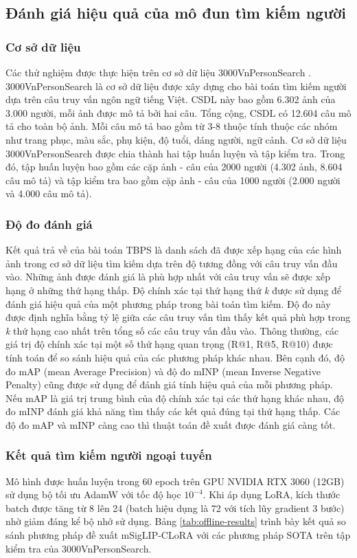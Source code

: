 \documentclass{jstarticle}
\begin{document}
\subsection{Đánh giá hiệu quả của mô đun tìm kiếm người}
\subsubsection{Cơ sở dữ liệu}
Các thử nghiệm được thực hiện trên cơ sở dữ liệu  3000VnPersonSearch \cite{pham2022towards}.  3000VnPersonSearch là cơ sở dữ liệu được xây dựng cho bài toán tìm kiếm người dựa trên câu truy vấn ngôn ngữ tiếng Việt. CSDL này bao gồm 6.302 ảnh của 3.000 người, mỗi ảnh được mô tả bởi hai câu. Tổng cộng, CSDL có 12.604 câu mô tả cho toàn bộ ảnh. Mỗi câu mô tả bao gồm từ 3-8 thuộc tính thuộc các nhóm như trang phục, màu sắc, phụ kiện, độ tuổi, dáng người, ngữ cảnh.  Cơ sở dữ liệu 3000VnPersonSearch được chia thành hai tập huấn luyện và tập kiểm tra. Trong đó, tập huấn luyện bao gồm các cặp ảnh - câu của 2000 người (4.302 ảnh, 8.604 câu mô tả) và tập kiểm tra bao gồm cặp ảnh - câu của 1000 người (2.000 người và 4.000 câu mô tả). 

\subsubsection{Độ đo đánh giá}
Kết quả trả về của bài toán TBPS là danh sách đã được xếp hạng của các hình ảnh trong cơ sở dữ liệu tìm kiếm dựa trên độ tương đồng với câu truy vấn đầu vào. Những ảnh được đánh giá là phù hợp nhất với câu truy vấn sẽ được xếp hạng ở những thứ hạng thấp. Độ chính xác tại thứ hạng thứ \textit{k} được sử dụng để đánh giá hiệu quả của một phương pháp trong bài toán tìm kiếm. Độ đo này được định nghĩa bằng tỷ lệ giữa các câu truy vấn  tìm thấy kết quả phù hợp trong \textit{k} thứ hạng cao nhất trên tổng số các câu truy vấn đầu vào.  Thông thường, các giá trị độ chính xác tại một số thứ hạng quan trọng (R@1, R@5, R@10) được tính toán để so sánh hiệu quả của các phương pháp khác nhau. Bên cạnh đó, độ đo mAP (mean Average Precision) và độ đo mINP (mean Inverse Negative Penalty) cũng được sử dụng để đánh giá tính hiệu quả của mỗi phương pháp. Nếu mAP là giá trị trung bình của độ chính xác tại các thứ hạng khác nhau, độ đo mINP đánh giá khả năng tìm thấy các kết quả đúng tại thứ hạng thấp. Các độ đo mAP và mINP càng cao thì thuật toán đề xuất được đánh giá càng tốt. 
\subsubsection{Kết quả tìm kiếm người ngoại tuyến}
Mô hình được huấn luyện trong 60 epoch trên GPU NVIDIA RTX 3060 (12GB) sử dụng bộ tối ưu AdamW với tốc độ học $10^{-4}$. Khi áp dụng LoRA, kích thước batch được tăng từ 8 lên 24 (batch hiệu dụng là 72 với tích lũy gradient 3 bước) nhờ giảm đáng kể bộ nhớ sử dụng. Bảng \ref{tab:offline-results} trình bày kết quả so sánh phương pháp đề xuất mSigLIP-CLoRA với các phương pháp SOTA trên tập kiểm tra của 3000VnPersonSearch.
\end{document}
